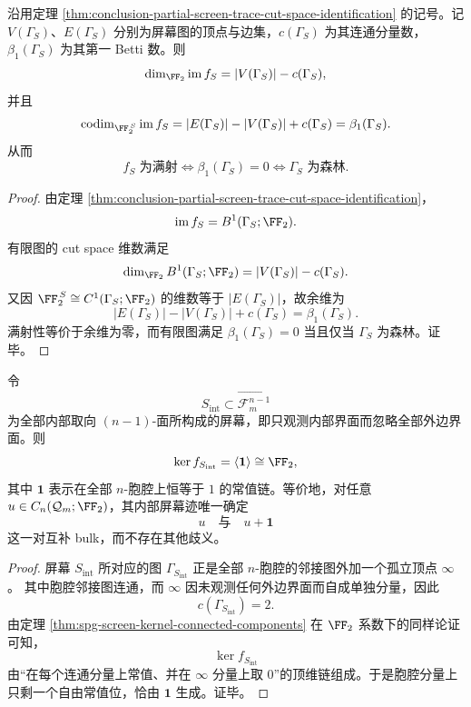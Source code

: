 \begin{corollary}\label{cor:conclusion-screen-realizability-cycle-space-obstruction}
沿用定理 \ref{thm:conclusion-partial-screen-trace-cut-space-identification} 的记号。记 \(V(\Gamma_S)\)、\(E(\Gamma_S)\) 分别为屏幕图的顶点与边集，\(c(\Gamma_S)\) 为其连通分量数，\(\beta_1(\Gamma_S)\) 为其第一 Betti 数。则
\[
\dim_{\FF_2}\operatorname{im}f_S=|V(\Gamma_S)|-c(\Gamma_S),
\]
并且
\[
\operatorname{codim}_{\FF_2^{\,S}}\operatorname{im}f_S
=
|E(\Gamma_S)|-|V(\Gamma_S)|+c(\Gamma_S)
=
\beta_1(\Gamma_S).
\]
从而
\[
f_S\text{ 为满射}
\iff
\beta_1(\Gamma_S)=0
\iff
\Gamma_S\text{ 为森林}.
\]
\end{corollary}

\begin{proof}
由定理 \ref{thm:conclusion-partial-screen-trace-cut-space-identification}，
\[
\operatorname{im}f_S=B^1(\Gamma_S;\FF_2).
\]
有限图的 cut space 维数满足
\[
\dim_{\FF_2}B^1(\Gamma_S;\FF_2)=|V(\Gamma_S)|-c(\Gamma_S).
\]
又因 \(\FF_2^{\,S}\cong C^1(\Gamma_S;\FF_2)\) 的维数等于 \(|E(\Gamma_S)|\)，故余维为
\[
|E(\Gamma_S)|-|V(\Gamma_S)|+c(\Gamma_S)=\beta_1(\Gamma_S).
\]
满射性等价于余维为零，而有限图满足 \(\beta_1(\Gamma_S)=0\) 当且仅当 \(\Gamma_S\) 为森林。证毕。
\end{proof}

\begin{theorem}\label{thm:conclusion-full-internal-screen-global-complement-law}
令
\[
S_{\mathrm{int}}\subset \overrightarrow{\mathcal F_m^{n-1}}
\]
为全部内部取向 \((n-1)\)-面所构成的屏幕，即只观测内部界面而忽略全部外边界面。则
\[
\ker f_{S_{\mathrm{int}}}
=
\langle \mathbf 1\rangle
\cong
\FF_2,
\]
其中 \(\mathbf 1\) 表示在全部 \(n\)-胞腔上恒等于 \(1\) 的常值链。等价地，对任意 \(u\in C_n(\mathcal Q_m;\FF_2)\)，其内部屏幕迹唯一确定
\[
u
\quad\text{与}\quad
u+\mathbf 1
\]
这一对互补 bulk，而不存在其他歧义。
\end{theorem}

\begin{proof}
屏幕 \(S_{\mathrm{int}}\) 所对应的图 \(\Gamma_{S_{\mathrm{int}}}\) 正是全部 \(n\)-胞腔的邻接图外加一个孤立顶点 \(\infty\)。
其中胞腔邻接图连通，而 \(\infty\) 因未观测任何外边界面而自成单独分量，因此
\[
c(\Gamma_{S_{\mathrm{int}}})=2.
\]
由定理 \ref{thm:spg-screen-kernel-connected-components} 在 \(\FF_2\) 系数下的同样论证可知，
\[
\ker f_{S_{\mathrm{int}}}
\]
由“在每个连通分量上常值、并在 \(\infty\) 分量上取 \(0\)”的顶维链组成。于是胞腔分量上只剩一个自由常值位，恰由 \(\mathbf 1\) 生成。证毕。
\end{proof}

